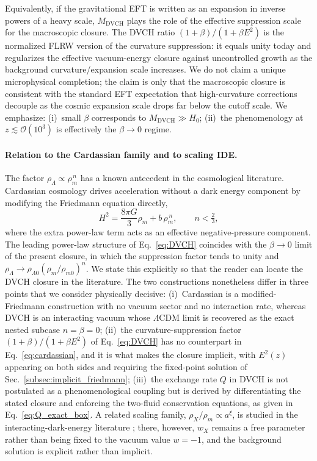 \documentclass[pdflatex,sn-mathphys-num]{sn-jnl}%
\begin{document}
Equivalently, if the gravitational EFT is written as an expansion in inverse
powers of a heavy scale, $M_{\mathrm{DVCH}}$ plays the role of the effective
suppression scale for the macroscopic closure. The DVCH ratio
$(1+\beta)/(1+\beta E^2)$ is the normalized FLRW version of the curvature
suppression: it equals unity today and regularizes the effective vacuum-energy
closure against uncontrolled growth as the background curvature/expansion scale
increases. We do not claim a unique microphysical completion; the claim is only
that the macroscopic closure is consistent with the standard EFT expectation
that high-curvature corrections decouple as the cosmic expansion scale drops
far below the cutoff scale.
We emphasize:
(i)~small $\beta$ corresponds to $M_{\mathrm{DVCH}}\gg H_0$;
(ii)~the phenomenology at $z\lesssim \mathcal{O}(10^3)$ is effectively the
$\beta\to 0$ regime.

\paragraph{Relation to the Cardassian family and to scaling IDE.}
The factor $\rho_\Lambda\propto\rho_m^{\,n}$ has a known antecedent in the
cosmological literature. Cardassian cosmology
\cite{Freese:2002card,Gondolo:2002card} drives acceleration without a dark
energy component by modifying the Friedmann equation directly,
\begin{equation}
H^2=\frac{8\pi G}{3}\rho_m+b\,\rho_m^{\,n},
\qquad n<\tfrac23 ,
\label{eq:cardassian}
\end{equation}
where the extra power-law term acts as an effective negative-pressure
component. The leading power-law structure of Eq.~\eqref{eq:DVCH} coincides
with the $\beta\to0$ limit of the present closure, in which the suppression
factor tends to unity and $\rho_\Lambda\to\rho_{\Lambda0}(\rho_m/\rho_{m0})^n$.
We state this explicitly so that the reader can locate the DVCH closure in the
literature. The two constructions nonetheless differ in three points that we
consider physically decisive: (i)~Cardassian is a modified-Friedmann
construction with no vacuum sector and no interaction rate, whereas DVCH is an
interacting vacuum whose $\Lambda$CDM limit is recovered as the exact nested
subcase $n=\beta=0$; (ii)~the curvature-suppression factor
$(1+\beta)/(1+\beta E^2)$ of Eq.~\eqref{eq:DVCH} has no counterpart in
Eq.~\eqref{eq:cardassian}, and it is what makes the closure implicit, with
$E^2(z)$ appearing on both sides and requiring the fixed-point solution of
Sec.~\ref{subsec:implicit_friedmann}; (iii)~the exchange rate $Q$ in DVCH is
not postulated as a phenomenological coupling but is derived by differentiating
the stated closure and enforcing the two-fluid conservation equations, as given
in Eq.~\eqref{eq:Q_exact_box}. A related scaling family, $\rho_X/\rho_m\propto
a^{\xi}$, is studied in the interacting-dark-energy literature
\cite{Zimdahl:2004int,Cao:2011zz}; there, however, $w_X$ remains a free
parameter rather than being fixed to the vacuum value $w=-1$, and the
background solution is explicit rather than implicit.
\end{document}
